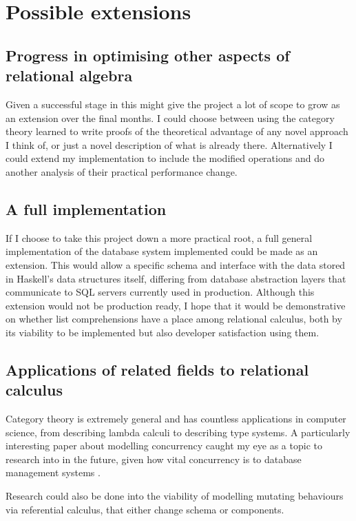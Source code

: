 \section{Possible extensions}
\subsection{Progress in optimising other aspects of relational algebra}
Given a successful stage in  this might give the project a lot of scope to grow as an extension over the final months. I could choose between using the category theory learned to write proofs of the theoretical advantage of any novel approach I think of, or just a novel description of what is already there. Alternatively I could extend my implementation to include the modified operations and do another analysis of their practical performance change.
\subsection{A full implementation}
If I choose to take this project down a more practical root, a full general implementation of the database system implemented could be made as an extension. This would allow a specific schema and interface with the data stored in Haskell's data structures itself, differing from database abstraction layers that communicate to SQL servers currently used in production.\cite{HDBC} Although this extension would not be production ready, I hope that it would be demonstrative on whether list comprehensions have a place among relational calculus, both by its viability to be implemented but also developer satisfaction using them.
\subsection{Applications of related fields to relational calculus}
Category theory is extremely general and has countless applications in computer science, from describing lambda calculi to describing type systems.\cite{BasicCategoryTheoryforCS} A particularly interesting paper about modelling concurrency \cite{CategoriesForModellingConcurrency} caught my eye as a topic to research into in the future, given how vital concurrency is to database management systems \cite{DatabaseSystems}.

Research could also be done into the viability of modelling mutating behaviours via referential calculus, that either change schema or components.
